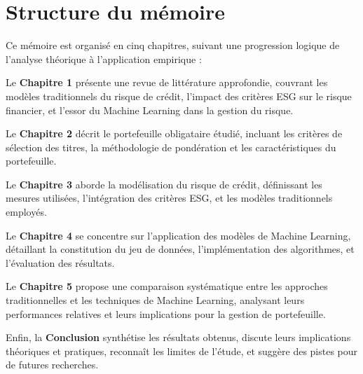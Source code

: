 \section{Structure du mémoire}

Ce mémoire est organisé en cinq chapitres, suivant une progression logique de l'analyse théorique à l'application empirique :

Le \textbf{Chapitre 1} présente une revue de littérature approfondie, couvrant les modèles traditionnels du risque de crédit, l'impact des critères ESG sur le risque financier, et l'essor du Machine Learning dans la gestion du risque.

Le \textbf{Chapitre 2} décrit le portefeuille obligataire étudié, incluant les critères de sélection des titres, la méthodologie de pondération et les caractéristiques du portefeuille.

Le \textbf{Chapitre 3} aborde la modélisation du risque de crédit, définissant les mesures utilisées, l'intégration des critères ESG, et les modèles traditionnels employés.

Le \textbf{Chapitre 4} se concentre sur l'application des modèles de Machine Learning, détaillant la constitution du jeu de données, l'implémentation des algorithmes, et l'évaluation des résultats.

Le \textbf{Chapitre 5} propose une comparaison systématique entre les approches traditionnelles et les techniques de Machine Learning, analysant leurs performances relatives et leurs implications pour la gestion de portefeuille.

Enfin, la \textbf{Conclusion} synthétise les résultats obtenus, discute leurs implications théoriques et pratiques, reconnaît les limites de l'étude, et suggère des pistes pour de futures recherches.